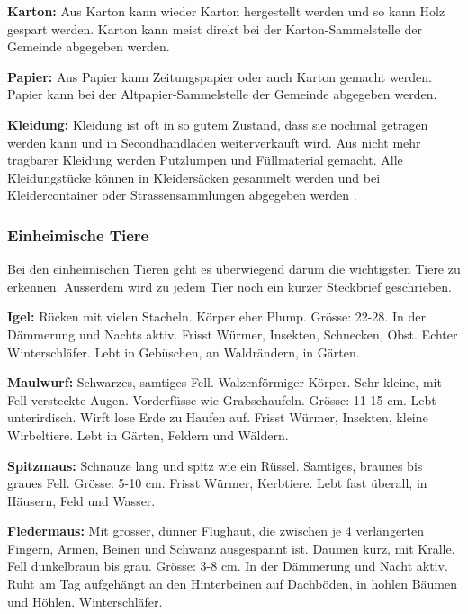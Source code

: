 \textbf{Karton: }Aus Karton kann wieder Karton hergestellt werden und so kann Holz gespart werden. Karton kann meist direkt bei der Karton-Sammelstelle der Gemeinde abgegeben werden. \par

\textbf{Papier: }Aus Papier kann Zeitungspapier oder auch Karton gemacht werden. Papier kann bei der Altpapier-Sammelstelle der Gemeinde abgegeben werden. \par

\textbf{Kleidung: }Kleidung ist oft in so gutem Zustand, dass sie nochmal getragen werden kann und in Secondhandläden weiterverkauft wird. Aus nicht mehr tragbarer Kleidung werden Putzlumpen und Füllmaterial gemacht. Alle Kleidungstücke können in Kleidersäcken gesammelt werden und bei Kleidercontainer oder Strassensammlungen abgegeben werden \cite{noauthor_migros_2024}.

\subsubsection{Einheimische Tiere}

Bei den einheimischen Tieren geht es überwiegend darum die wichtigsten Tiere zu erkennen. Ausserdem wird zu jedem Tier noch ein kurzer Steckbrief geschrieben. \par

\textbf{Igel: }Rücken mit vielen Stacheln. Körper eher Plump. Grösse: 22-28. In der Dämmerung und Nachts aktiv. Frisst Würmer, Insekten, Schnecken, Obst. Echter Winterschläfer. Lebt in Gebüschen, an Waldrändern, in Gärten. \par

\textbf{Maulwurf: }Schwarzes, samtiges Fell. Walzenförmiger Körper. Sehr kleine, mit Fell versteckte Augen. Vorderfüsse wie Grabschaufeln. Grösse: 11-15 cm. Lebt unterirdisch. Wirft lose Erde zu Haufen auf. Frisst Würmer, Insekten, kleine Wirbeltiere. Lebt in Gärten, Feldern und Wäldern. \par

\textbf{Spitzmaus: }Schnauze lang und spitz wie ein Rüssel. Samtiges, braunes bis graues Fell. Grösse: 5-10 cm. Frisst Würmer, Kerbtiere. Lebt fast überall, in Häusern, Feld und Wasser.\par

\textbf{Fledermaus: }Mit grosser, dünner Flughaut, die zwischen je 4 verlängerten Fingern, Armen, Beinen und Schwanz ausgespannt ist. Daumen kurz, mit Kralle. Fell dunkelbraun bis grau. Grösse: 3-8 cm. In der Dämmerung und Nacht aktiv. Ruht am Tag aufgehängt an den Hinterbeinen auf Dachböden, in hohlen Bäumen und Höhlen. Winterschläfer. \par

